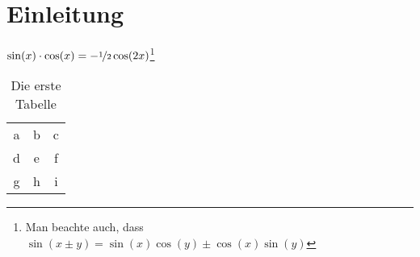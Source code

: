 

\chapter{Einleitung}

\blindtext$\sin(x)\cdot\cos(x) = -\nicefrac{1}{2} \cos(2x)$\footnote{Man beachte auch, dass $\sin(x\pm y) = \sin(x)\cos(y) \pm \cos(x)\sin(y)$}

\begin{table}[h]
  \centering
  \begin{tabular}{ccc}
    \toprule
    a & b & c\\
    d & e & f\\
    g & h & i\\
    \bottomrule
  \end{tabular}
  \caption{Die erste Tabelle}
  \label{tab:tabelle1}
\end{table}